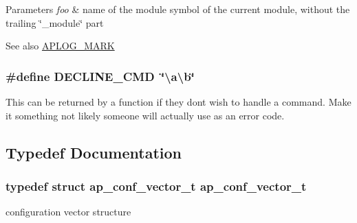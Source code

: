 \begin{DoxyParams}{Parameters}
{\em foo} & name of the module symbol of the current module, without the trailing \char`\"{}\+\_\+module\char`\"{} part \\
\hline
\end{DoxyParams}
\begin{DoxySeeAlso}{See also}
\hyperlink{group__APACHE__CORE__LOG_ga655e126996849bcb82e4e5a14c616f4a}{A\+P\+L\+O\+G\+\_\+\+M\+A\+RK} 
\end{DoxySeeAlso}
\subsubsection[{\texorpdfstring{D\+E\+C\+L\+I\+N\+E\+\_\+\+C\+MD}{DECLINE_CMD}}]{\setlength{\rightskip}{0pt plus 5cm}\#define D\+E\+C\+L\+I\+N\+E\+\_\+\+C\+MD~\char`\"{}\textbackslash{}a\textbackslash{}b\char`\"{}}\hypertarget{group__APACHE__CORE__CONFIG_gaba8452f6517f2121414fbf4d44c92fa7}{}\label{group__APACHE__CORE__CONFIG_gaba8452f6517f2121414fbf4d44c92fa7}
This can be returned by a function if they don\textquotesingle{}t wish to handle a command. Make it something not likely someone will actually use as an error code. 

\subsection{Typedef Documentation}
\subsubsection[{\texorpdfstring{ap\+\_\+conf\+\_\+vector\+\_\+t}{ap_conf_vector_t}}]{\setlength{\rightskip}{0pt plus 5cm}typedef struct {\bf ap\+\_\+conf\+\_\+vector\+\_\+t} {\bf ap\+\_\+conf\+\_\+vector\+\_\+t}}\hypertarget{group__APACHE__CORE__CONFIG_ga614684670dbf748a70ac6bad272da59c}{}\label{group__APACHE__CORE__CONFIG_ga614684670dbf748a70ac6bad272da59c}
configuration vector structure 
